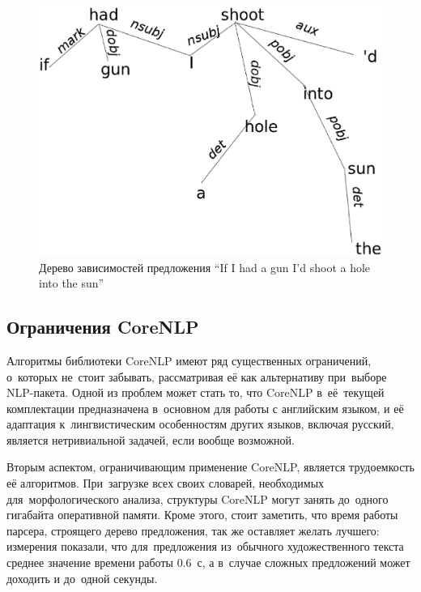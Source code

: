 \begin{figure}
\begin{center}
\includegraphics[scale=0.4]{eps/dependency_tree.eps}
\caption{Дерево зависимостей предложения ``If I had a gun I'd shoot a hole into the sun''}
\label{fig:dependency_tree}
\end{center}
\end{figure}

\subsection{Ограничения CoreNLP}

Алгоритмы библиотеки CoreNLP имеют ряд существенных ограничений, о~которых не~стоит забывать, 
рассматривая её как альтернативу при~выборе NLP-пакета.
Одной из проблем может стать то, что CoreNLP в~её~текущей комплектации
предназначена в~основном для работы с английским языком, 
и её адаптация к~лингвистическим особенностям других языков, включая русский,
является нетривиальной задачей, если вообще возможной.

Вторым аспектом, ограничивающим применение CoreNLP, является трудоемкость её алгоритмов. 
При~загрузке всех своих словарей, необходимых для~морфологического анализа, 
структуры CoreNLP могут занять до~одного гигабайта оперативной памяти.
Кроме этого, стоит заметить, что время работы парсера, строящего дерево предложения,
так же оставляет желать лучшего: измерения показали, что для~предложения
из~обычного художественного текста среднее значение времени работы $0.6$~с,
а в~случае сложных предложений может доходить и до~одной секунды.

